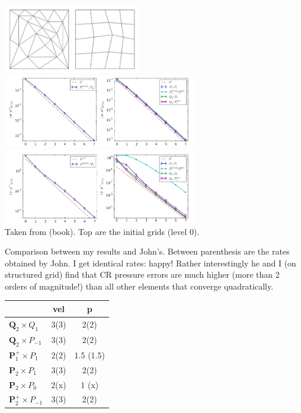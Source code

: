 \begin{center} 
\includegraphics[width=6cm]{python_codes/fieldstone_120/images/john_c}\\
\includegraphics[width=8.5cm]{python_codes/fieldstone_120/images/john_b}
\includegraphics[width=8.5cm]{python_codes/fieldstone_120/images/john_a}\\
{\captionfont Taken from \textcite{john16} (book). Top are the initial grids (level 0).}
\end{center} 


Comparison between my results and John's. 
Between parenthesis are the rates obtained by John. I get identical rates: happy!
Rather interestingly he and I (on structured grid) find that CR pressure errors are much 
higher (more than 2 orders of magnitude!) than all other elements 
that converge quadratically. 


\begin{center}
\begin{tabular}{lcc}
\hline
     & vel & p \\
\hline
${\bm Q}_2\times Q_1$ & 3(3) & 2(2)   \\
${\bm Q}_2\times P_{-1}$  & 3(3) & 2(2)   \\
${\bm P}_1^+\times P_1$ & 2(2) & 1.5 (1.5) \\
${\bm P}_2\times P_1$ & 3(3) & 2(2)   \\
${\bm P}_2\times P_0$ & 2(x) & 1 (x)   \\
${\bm P}_2^+\times P_{-1}$   & 3(3) & 2(2)   \\
\hline
\end{tabular}
\end{center}

